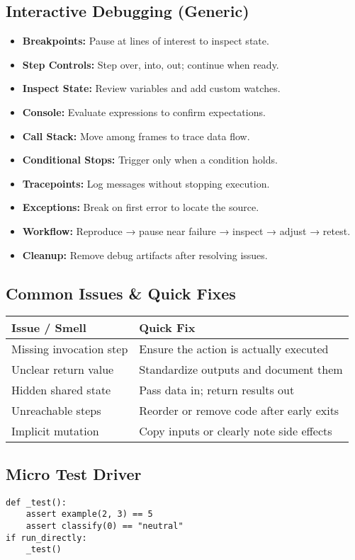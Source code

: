 \documentclass[11pt]{article}
\begin{document}
\subsection*{Interactive Debugging (Generic)}
\begin{itemize}\itemsep2pt
  \item \textbf{Breakpoints:} Pause at lines of interest to inspect state.
  \item \textbf{Step Controls:} Step over, into, out; continue when ready.
  \item \textbf{Inspect State:} Review variables and add custom watches.
  \item \textbf{Console:} Evaluate expressions to confirm expectations.
  \item \textbf{Call Stack:} Move among frames to trace data flow.
  \item \textbf{Conditional Stops:} Trigger only when a condition holds.
  \item \textbf{Tracepoints:} Log messages without stopping execution.
  \item \textbf{Exceptions:} Break on first error to locate the source.
  \item \textbf{Workflow:} Reproduce → pause near failure → inspect → adjust → retest.
  \item \textbf{Cleanup:} Remove debug artifacts after resolving issues.
\end{itemize}

\subsection*{Common Issues \& Quick Fixes}

\begin{tabular}{|l|l|}
\hline
Issue / Smell & Quick Fix \\ \hline
Missing invocation step & Ensure the action is actually executed \\
Unclear return value & Standardize outputs and document them \\
Hidden shared state & Pass data in; return results out \\
Unreachable steps & Reorder or remove code after early exits \\
Implicit mutation & Copy inputs or clearly note side effects \\ \hline
\end{tabular}

\subsection*{Micro Test Driver}
\begin{framed}\small\scriptsize
\begin{verbatim}
def _test():
    assert example(2, 3) == 5
    assert classify(0) == "neutral"
if run_directly:
    _test()
\end{verbatim}
\end{framed}
\end{document}
